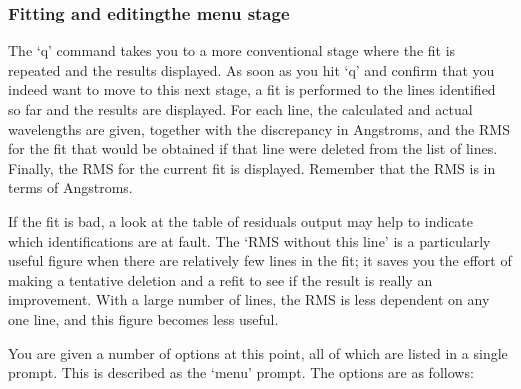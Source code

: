 
\subsubsection{\label{techno10menu}Fitting and editing\latorhtm{---}{-}the
   menu stage}

   The `q' command takes you to a more conventional stage where the fit
   is repeated and the results displayed.  As soon as you hit `q' and
   confirm that you indeed want to move to this next stage, a fit is
   performed to the lines identified so far and the results are
   displayed.  For each line, the calculated and actual wavelengths are
   given, together with the discrepancy in Angstroms, and the RMS for
   the fit that would be obtained if that line were deleted from the
   list of lines.  Finally, the RMS for the current fit is displayed.
   Remember that the RMS is in terms of Angstroms.

   If the fit is bad, a look at the table of residuals output may help
   to indicate which identifications are at fault. The `RMS without this
   line' is a particularly useful figure when there are relatively few
   lines in the fit; it saves you the effort of making a tentative
   deletion and a refit to see if the result is really an improvement.
   With a large number of lines, the RMS is less dependent on any one
   line, and this figure becomes less useful.

   You are given a number of options at this point, all of which are
   listed in a single prompt.  This is described as the `menu' prompt.
   The options are as follows:

